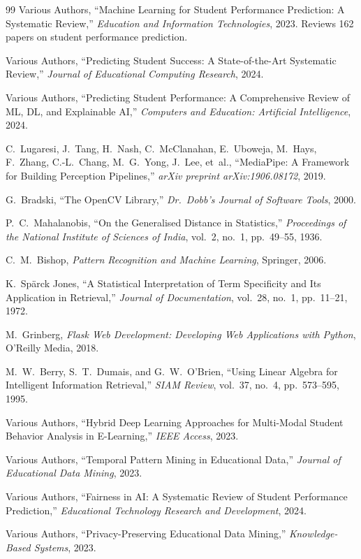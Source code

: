 \documentclass{article}
\begin{document}
\begin{thebibliography}{99}
Various Authors,
``Machine Learning for Student Performance Prediction: A Systematic Review,''
\textit{Education and Information Technologies}, 2023.
Reviews 162 papers on student performance prediction.

Various Authors,
``Predicting Student Success: A State-of-the-Art Systematic Review,''
\textit{Journal of Educational Computing Research}, 2024.

Various Authors,
``Predicting Student Performance: A Comprehensive Review of ML, DL, and Explainable AI,''
\textit{Computers and Education: Artificial Intelligence}, 2024.

C.~Lugaresi, J.~Tang, H.~Nash, C.~McClanahan, E.~Uboweja, M.~Hays, F.~Zhang, C.-L.~Chang, M.~G.~Yong, J.~Lee, et~al.,
``MediaPipe: A Framework for Building Perception Pipelines,''
\textit{arXiv preprint arXiv:1906.08172}, 2019.

G.~Bradski,
``The OpenCV Library,''
\textit{Dr.\ Dobb's Journal of Software Tools}, 2000.

P.~C.~Mahalanobis,
``On the Generalised Distance in Statistics,''
\textit{Proceedings of the National Institute of Sciences of India}, vol.~2, no.~1, pp.~49--55, 1936.

C.~M.~Bishop,
\textit{Pattern Recognition and Machine Learning},
Springer, 2006.

K.~Sp\"arck Jones,
``A Statistical Interpretation of Term Specificity and Its Application in Retrieval,''
\textit{Journal of Documentation}, vol.~28, no.~1, pp.~11--21, 1972.

M.~Grinberg,
\textit{Flask Web Development: Developing Web Applications with Python},
O'Reilly Media, 2018.

M.~W.~Berry, S.~T.~Dumais, and G.~W.~O'Brien,
``Using Linear Algebra for Intelligent Information Retrieval,''
\textit{SIAM Review}, vol.~37, no.~4, pp.~573--595, 1995.

Various Authors,
``Hybrid Deep Learning Approaches for Multi-Modal Student Behavior Analysis in E-Learning,''
\textit{IEEE Access}, 2023.

Various Authors,
``Temporal Pattern Mining in Educational Data,''
\textit{Journal of Educational Data Mining}, 2023.

Various Authors,
``Fairness in AI: A Systematic Review of Student Performance Prediction,''
\textit{Educational Technology Research and Development}, 2024.

Various Authors,
``Privacy-Preserving Educational Data Mining,''
\textit{Knowledge-Based Systems}, 2023.

\end{thebibliography}
\end{document}
